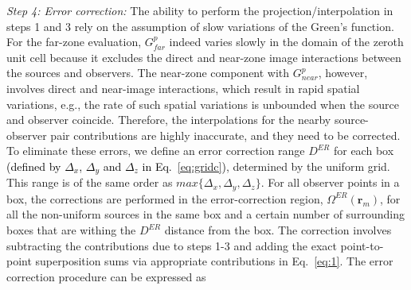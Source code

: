 \documentclass{article}
\begin{document}
\textit{Step 4: Error correction:}
The ability to perform the projection/interpolation in steps 1 and 3 rely on the assumption of slow variations of the Green's function. For the far-zone evaluation, $G^p_{far}$ indeed varies slowly in the domain of the zeroth unit cell because it excludes the direct and near-zone image interactions between the sources and observers. The near-zone component with $G^p_{near}$, however, involves direct and near-image interactions, which result in rapid spatial variations, e.g., the rate of such spatial variations is unbounded when the source and observer coincide. Therefore, the interpolations for the nearby source-observer pair contributions are highly inaccurate, and they need to be corrected. To eliminate these errors, we define an error correction range $D^{ER}$ for each box \textcolor{black}{(defined by $\Delta_x$, $\Delta_y$ and $\Delta_z$ in Eq.~\eqref{eq:gridc})}, determined by the uniform grid. This range is of the same order as $max\{\Delta_x,\Delta_y,\Delta_z\}$. For all observer points in a box, the corrections are performed in the error-correction region, $\Omega^{ER}(\mathbf{r}_m)$, for all the non-uniform sources in the same box and a certain number of surrounding boxes that are withing the $D^{ER}$ distance from the box. The correction involves subtracting the contributions due to steps 1-3 and adding the exact point-to-point superposition sums via appropriate contributions in Eq.~\eqref{eq:1}. The error correction procedure can be expressed as
\end{document}
